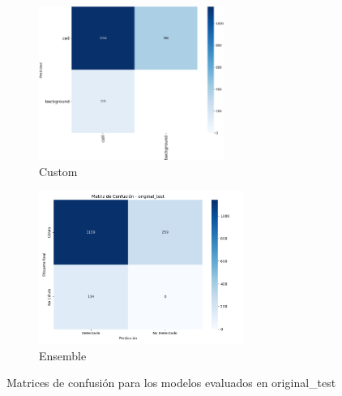 \documentclass[12pt,a4paper,onecolumn,oneside]{report}
\begin{document}
\begin{figure}[H]
  \vspace{0.1cm}
  \begin{subfigure}[b]{0.45\textwidth}
    \centering
    \includegraphics[height=5cm]{figuras/resultados experimentacion/custom/original_test/confusion_matrix.png}
    \vspace{-0.3cm}
    \caption{\footnotesize Custom}
    \label{fig:confusion_custom_original_test}
  \end{subfigure}
  \hfill
  \begin{subfigure}[b]{0.45\textwidth}
    \centering
    \includegraphics[height=5cm]{figuras/resultados experimentacion/ensemble/confusion_matrices/confusion_matrix_original_test.png}
    \vspace{-0.3cm}
    \caption{\footnotesize Ensemble}
    \label{fig:confusion_ensemble_original_test}
  \end{subfigure}
  
  \vspace{-0.2cm}
  \caption{Matrices de confusión para los modelos evaluados en original\_test}
  \label{fig:confusion_matrices_original_test}
\end{figure}
\end{document}

